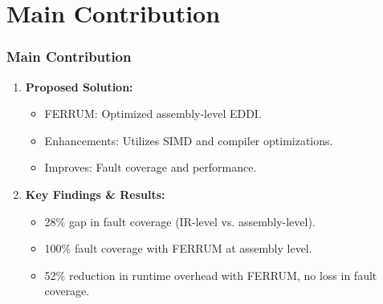 \documentclass[
	12pt, %
]{beamer}
\begin{document}

\section{Main Contribution}

\begin{frame}
	\frametitle{Main Contribution}
	
	\begin{enumerate}
		\item \textbf{Proposed Solution:}
		\begin{itemize}
			\item FERRUM: Optimized assembly-level EDDI.
			\item Enhancements: Utilizes SIMD and compiler optimizations.
			\item Improves: Fault coverage and performance.
		\end{itemize}
		
		
		\item \textbf{Key Findings \& Results:}
		\begin{itemize}
			\item 28\% gap in fault coverage (IR-level vs. assembly-level).
			\item 100\% fault coverage with FERRUM at assembly level.
			\item 52\% reduction in runtime overhead with FERRUM, no loss in fault coverage.
		\end{itemize}
	\end{enumerate}
	
	
	
	
	
	
	
\end{frame}
\end{document}
